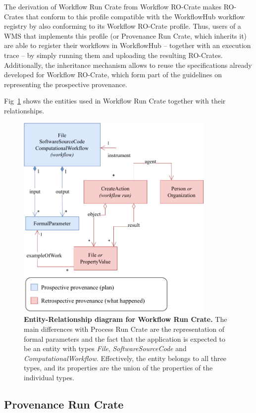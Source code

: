 \documentclass[10pt,letterpaper]{article}
\begin{document}
The derivation of Workflow Run Crate from Workflow RO-Crate makes RO-Crates that conform to this profile compatible with the WorkflowHub workflow registry by also conforming to its Workflow RO-Crate profile.
Thus, users of a WMS that implements this profile (or Provenance Run Crate, which inherits it) are able to register their workflows in WorkflowHub -- together with an execution trace -- by simply running them and uploading the resulting RO-Crates.
Additionally, the inheritance mechanism allows to reuse the specifications already developed for Workflow RO-Crate, which form part of the guidelines on representing the prospective provenance.

Fig~\ref{fig:workflow_crate_er} shows the entities used in Workflow Run Crate together with their relationships.

\begin{figure}[!h]
\includegraphics[width=26em]{wrroc-figure2.drawio.pdf}
\caption{{\bf Entity-Relationship diagram for Workflow Run Crate.}
The main differences with Process Run Crate are the representation of formal parameters and the fact that the application is expected to be an entity with types \emph{File}, \emph{SoftwareSourceCode} and \emph{ComputationalWorkflow}.
Effectively, the entity belongs to all three types, and its properties are the union of the properties of the individual types.
}
\label{fig:workflow_crate_er}
\end{figure}


\subsection{Provenance Run Crate}\label{provenance-run-crate}
\end{document}
